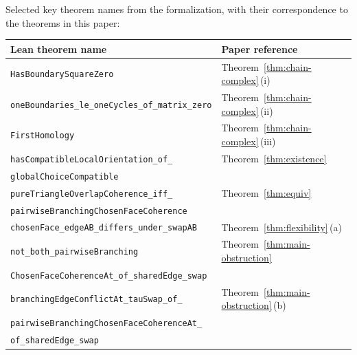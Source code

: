 \documentclass[11pt,a4paper]{article}
\theoremstyle{plain}
\theoremstyle{definition}
\theoremstyle{remark}
\begin{document}
\medskip

Selected key theorem names from the formalization, with their
correspondence to the theorems in this paper:

\medskip
\begin{center}
\small
\begin{tabular}{ll}
\toprule
\textbf{Lean theorem name} & \textbf{Paper reference} \\
\midrule
\texttt{HasBoundarySquareZero} &
  Theorem~\ref{thm:chain-complex}\,(i) \\
\texttt{oneBoundaries\_le\_oneCycles\_of\_matrix\_zero} &
  Theorem~\ref{thm:chain-complex}\,(ii) \\
\texttt{FirstHomology} &
  Theorem~\ref{thm:chain-complex}\,(iii) \\
\texttt{hasCompatibleLocalOrientation\_of\_} &
  Theorem~\ref{thm:existence} \\
\quad\texttt{globalChoiceCompatible} & \\
\texttt{pureTriangleOverlapCoherence\_iff\_} &
  Theorem~\ref{thm:equiv} \\
\quad\texttt{pairwiseBranchingChosenFaceCoherence} & \\
\texttt{chosenFace\_edgeAB\_differs\_under\_swapAB} &
  Theorem~\ref{thm:flexibility}\,(a) \\
\texttt{not\_both\_pairwiseBranching} &
  Theorem~\ref{thm:main-obstruction} \\
\quad\texttt{ChosenFaceCoherenceAt\_of\_sharedEdge\_swap} & \\
\texttt{branchingEdgeConflictAt\_tauSwap\_of\_} &
  Theorem~\ref{thm:main-obstruction}\,(b) \\
\quad\texttt{pairwiseBranchingChosenFaceCoherenceAt\_} & \\
\quad\texttt{of\_sharedEdge\_swap} & \\
\bottomrule
\end{tabular}
\end{center}
\end{document}
